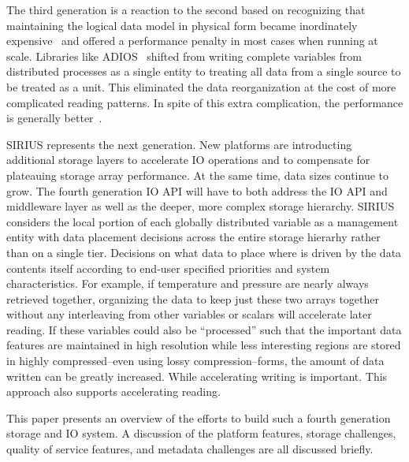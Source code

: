 \documentclass[letterpaper,twocolumn,10pt]{article}
\begin{document}
The third generation is a reaction to the second based on recognizing that
maintaining the logical data model in physical form became inordinately
expensive~\cite{lofstead:2011:six-degrees} and offered a performance penalty in
most cases when running at scale. Libraries like
ADIOS~\cite{lofstead:2009:adaptable} shifted from writing complete variables
from distributed processes as a single entity to treating all data from a
single source to be treated as a unit. This eliminated the data reorganization
at the cost of more complicated reading patterns. In spite of this extra
complication, the performance is generally
better~\cite{lofstead:2011:six-degrees}.

SIRIUS represents the next generation. New platforms are introducting
additional storage layers to accelerate IO operations and to compensate for
plateauing storage array performance. At the same time, data sizes continue
to grow. The fourth generation IO API will have to both address the IO API
and middleware layer as well as the deeper, more complex storage hierarchy.
SIRIUS considers the local portion of each globally distributed variable as a
management entity with data placement decisions across the entire storage
hierarhy rather than on a single tier.  Decisions on what data to place where
is driven by the data contents itself according to end-user specified
priorities and system characteristics. For example, if temperature and pressure
are nearly always retrieved together, organizing the data to keep just these
two arrays together without any interleaving from other variables or scalars
will accelerate later reading. If these variables could also be ``processed''
such that the important data features are maintained in high resolution while
less interesting regions are stored in highly compressed--even using lossy
compression--forms, the amount of data written can be greatly increased. While
accelerating writing is important. This approach also supports accelerating
reading.

This paper presents an overview of the efforts to build such a fourth
generation storage and IO system. A discussion of the platform features,
storage challenges, quality of service features, and metadata challenges are
all discussed briefly.

\end{document}
